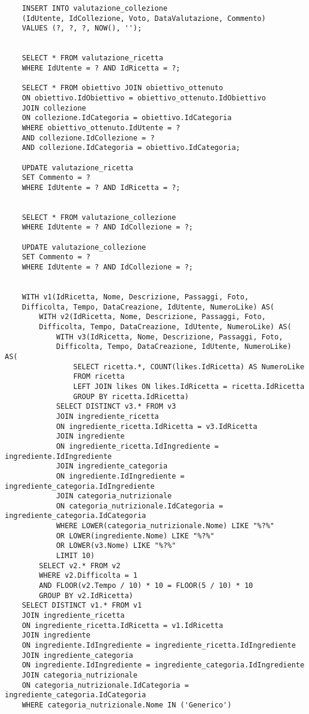 ﻿\documentclass[a4paper,12pt]{report}
\begin{document}
\begin{verbatim}
    INSERT INTO valutazione_collezione
    (IdUtente, IdCollezione, Voto, DataValutazione, Commento)
    VALUES (?, ?, ?, NOW(), '');
    
    
    SELECT * FROM valutazione_ricetta
    WHERE IdUtente = ? AND IdRicetta = ?;
    
    SELECT * FROM obiettivo JOIN obiettivo_ottenuto
    ON obiettivo.IdObiettivo = obiettivo_ottenuto.IdObiettivo
    JOIN collezione
    ON collezione.IdCategoria = obiettivo.IdCategoria
    WHERE obiettivo_ottenuto.IdUtente = ?
    AND collezione.IdCollezione = ?
    AND collezione.IdCategoria = obiettivo.IdCategoria;
    
    UPDATE valutazione_ricetta
    SET Commento = ?
    WHERE IdUtente = ? AND IdRicetta = ?;
    
    
    SELECT * FROM valutazione_collezione
    WHERE IdUtente = ? AND IdCollezione = ?;
    
    UPDATE valutazione_collezione
    SET Commento = ?
    WHERE IdUtente = ? AND IdCollezione = ?;
    
    
    WITH v1(IdRicetta, Nome, Descrizione, Passaggi, Foto,
    Difficolta, Tempo, DataCreazione, IdUtente, NumeroLike) AS(
        WITH v2(IdRicetta, Nome, Descrizione, Passaggi, Foto, 
        Difficolta, Tempo, DataCreazione, IdUtente, NumeroLike) AS(
            WITH v3(IdRicetta, Nome, Descrizione, Passaggi, Foto, 
            Difficolta, Tempo, DataCreazione, IdUtente, NumeroLike) AS(
                SELECT ricetta.*, COUNT(likes.IdRicetta) AS NumeroLike
                FROM ricetta
                LEFT JOIN likes ON likes.IdRicetta = ricetta.IdRicetta
                GROUP BY ricetta.IdRicetta)
            SELECT DISTINCT v3.* FROM v3
            JOIN ingrediente_ricetta
            ON ingrediente_ricetta.IdRicetta = v3.IdRicetta
            JOIN ingrediente
            ON ingrediente_ricetta.IdIngrediente = ingrediente.IdIngrediente
            JOIN ingrediente_categoria
            ON ingrediente.IdIngrediente = ingrediente_categoria.IdIngrediente
            JOIN categoria_nutrizionale 
            ON categoria_nutrizionale.IdCategoria = ingrediente_categoria.IdCategoria
            WHERE LOWER(categoria_nutrizionale.Nome) LIKE "%?%"
            OR LOWER(ingrediente.Nome) LIKE "%?%"
            OR LOWER(v3.Nome) LIKE "%?%"
            LIMIT 10)
        SELECT v2.* FROM v2
        WHERE v2.Difficolta = 1
        AND FLOOR(v2.Tempo / 10) * 10 = FLOOR(5 / 10) * 10 
        GROUP BY v2.IdRicetta)
    SELECT DISTINCT v1.* FROM v1
    JOIN ingrediente_ricetta
    ON ingrediente_ricetta.IdRicetta = v1.IdRicetta
    JOIN ingrediente
    ON ingrediente.IdIngrediente = ingrediente_ricetta.IdIngrediente
    JOIN ingrediente_categoria
    ON ingrediente.IdIngrediente = ingrediente_categoria.IdIngrediente
    JOIN categoria_nutrizionale
    ON categoria_nutrizionale.IdCategoria = ingrediente_categoria.IdCategoria
    WHERE categoria_nutrizionale.Nome IN ('Generico')
    

\end{verbatim}
\end{document}
